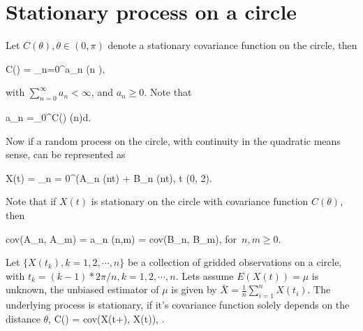 
\section{Stationary process on a circle}

Let $C(\theta), \theta \in (0, \pi)$ denote a stationary covariance function on the circle, then

\beq
C(\theta) = \sum_{n=0}^\infty a_n \cos(n \theta),
\eeq

with $\sum_{n = 0}^\infty a_n < \infty$, and $a_n \ge 0$. Note that

\beq
a_n  =\int_0^\pi C(\theta) \cos(n\theta)d\theta.
\eeq


Now if a random process on the circle, with continuity in the quadratic means sense, can be represented as

\beq
X(t) = \sum_{n = 0}^\infty (A_n \cos(nt) + B_n \sin(nt), \quad t \in (0, 2\pi).
\eeq

Note that if $X(t)$ is stationary on the circle with covariance function $C(\theta)$, then

\beq
cov(A_n, A_m) = a_n \delta(n,m) = cov(B_n, B_m), \quad \mbox{for $n, m \ge 0$}.
\eeq


Let $\{X(t_k), k = 1, 2, \cdots, n\}$ be a collection of gridded observations on a circle, with $t_k = (k-1)*2\pi/n, k = 1, 2, \cdots, n$. Lets assume $E(X(t)) = \mu$ is unknown, the unbiased estimator of $\mu$ is given by $\bar{X} = \frac{1}{n}\sum_{i=1}^{n} X(t_i)$. The underlying process is stationary, if it's covariance function solely depends on the distance $\theta$,
\beq
C(\theta) = cov(X(t+\theta), X(t)), \quad \quad \theta \in [0, \pi].
\eeq

% 


